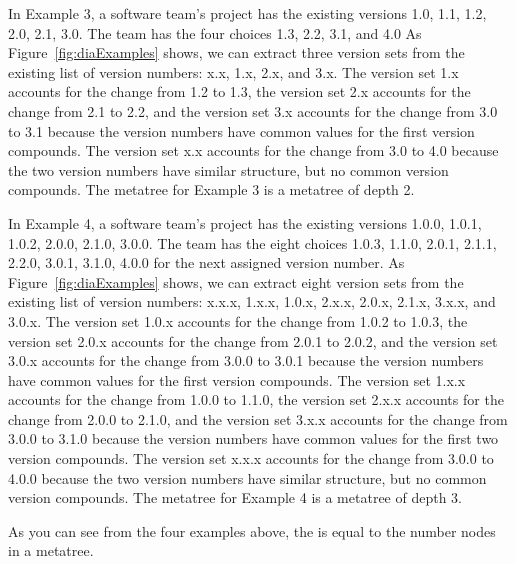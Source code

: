 \documentclass[conference]{IEEEtran}
\begin{document}
In Example 3, a software team's project has the existing versions 1.0, 1.1, 1.2, 2.0, 2.1, 3.0. The team has the four choices 1.3, 2.2, 3.1, and 4.0 
As Figure~\ref{fig:diaExamples} shows, we can extract three version sets from the existing list of version numbers: x.x, 1.x, 2.x, and 3.x. 
The version set 1.x accounts for the change from 1.2 to 1.3, the version set 2.x accounts for the change from 2.1 to 2.2, and the version set 3.x accounts for the change from 3.0 to 3.1 because the version numbers have common values for the first version compounds. 
The version set x.x accounts for the change from 3.0 to 4.0 because the two version numbers have similar structure, but no common version compounds.
The metatree for Example 3 is a metatree of depth 2.

In Example 4, a software team's project has the existing versions 1.0.0, 1.0.1, 1.0.2, 2.0.0, 2.1.0, 3.0.0.
 The team has the eight choices 1.0.3, 1.1.0, 2.0.1, 2.1.1, 2.2.0, 3.0.1, 3.1.0, 4.0.0 for the next assigned version number. 
As Figure~\ref{fig:diaExamples} shows, we can extract eight version sets from the existing list of version numbers: x.x.x, 1.x.x, 1.0.x, 2.x.x, 2.0.x, 2.1.x, 3.x.x, and 3.0.x. 
The version set 1.0.x accounts for the change from 1.0.2 to 1.0.3, the version set 2.0.x accounts for the change from 2.0.1 to 2.0.2, and the version set 3.0.x accounts for the change from 3.0.0 to 3.0.1 because the version numbers have common values for the first version compounds. 
The version set 1.x.x accounts for the change from 1.0.0 to 1.1.0, the version set 2.x.x accounts for the change from 2.0.0 to 2.1.0, and the version set 3.x.x accounts for the change from 3.0.0 to 3.1.0 because the version numbers have common values for the first two version compounds. 
The version set x.x.x accounts for the change from 3.0.0 to 4.0.0 because the two version numbers have similar structure, but no common version compounds.
The metatree for Example 4 is a metatree of depth 3.

As you can see from the four examples above, the \numberchoices is equal to the number nodes in a metatree.

 
\end{document}
